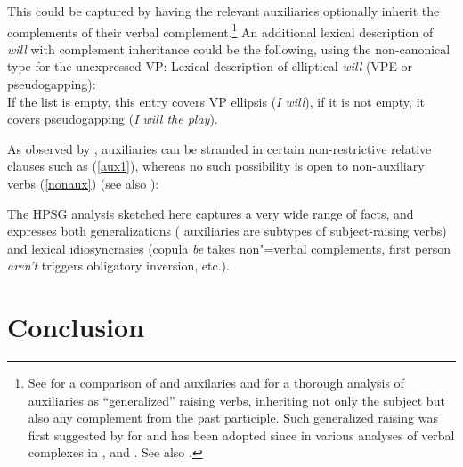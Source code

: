 \noindent
This could be captured by having the relevant auxiliaries optionally inherit the complements of their verbal complement.\footnote{See  for a comparison of  and  auxilaries and  for a thorough analysis of  auxiliaries as ``generalized'' raising verbs, inheriting not only the subject but also any complement from the past participle. Such generalized raising was first suggested by \citet{HN89a,HN94a} for  and has been adopted since in various analyses of verbal complexes in  \citep{Kiss95a,Meurers2000b,Kathol2001a,Mueller99a,Mueller2002b},  \citep{BvN98a} and  \citep[Section~4]{MuellerPersian}. See also .}
An additional lexical description of \emph{will} with complement inheritance could be the following, using the non-canonical  type  for the unexpressed VP:
\ea
Lexical description of elliptical \emph{will} (VPE or pseudogapping):\\
\z
If the list  is empty, this entry covers VP ellipsis (\emph{I will}), if it is not empty, it covers pseudogapping (\emph{I will the play}).

As observed by \citet{ArnoldandBorsley2008}, auxiliaries can be stranded in certain non-restrictive
relative clauses such as (\ref{aux1}), whereas no such possibility is open to non-auxiliary verbs
(\ref{nonaux}) (see also \crossrefchapteralt[\page \pageref{page-relative-clauses:stranded-aux}]{relative-clauses}):

\eal
{}
\zl

The HPSG analysis sketched here captures a very wide range of facts, and expresses both generalizations ( auxiliaries are subtypes of subject-raising verbs) and lexical idiosyncrasies (copula \emph{be} takes non"=verbal complements, first person \emph{aren't} triggers obligatory inversion, etc.).


	
\section{Conclusion}

